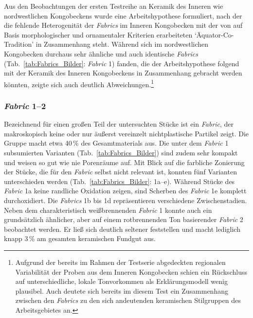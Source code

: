 Aus den Beobachtungen der ersten Testreihe an Keramik des Inneren wie nordwestlichen Kongobeckens wurde eine Arbeitshypothese formuliert, nach der die fehlende Heterogenität der \textit{Fabrics} im Inneren Kongobecken mit der von \textcite[58ff.]{Wotzka.1995} auf Basis morphologischer und ornamentaler Kriterien erarbeiteten \enquote*{Äquator-Co-Tradition} in Zusammenhang steht. Während sich im nordwestlichen Kongobecken durchaus sehr ähnliche und auch identische \textit{Fabrics} (Tab.~\ref{tab:Fabrics_Bilder}: \textit{Fabric} 1) fanden, die der Arbeitshypothese folgend mit der Keramik des Inneren Kongobeckens in Zusammenhang gebracht werden könnten, zeigte sich auch deutlich Abweichungen.\footnote{Aufgrund der bereits im Rahmen der Testserie abgedeckten regionalen Variabilität der Proben aus dem Inneren Kongobecken schien ein Rückschluss auf unterschiedliche, lokale Tonvorkommen als Erklärungsmodell wenig plausibel. Auch deutete sich bereits im diesem Test ein Zusammenhang zwischen den \textit{Fabrics} zu den sich andeutenden keramischen Stilgruppen des Arbeitsgebietes an.}


\subsubsection*{\textit{Fabric} 1--2}

Bezeichnend für einen großen Teil der untersuchten Stücke ist ein \textit{Fabric}, der makroskopisch keine oder nur äußerst vereinzelt nichtplastische Partikel zeigt. Die Gruppe macht etwa 40\,\% des Gesamtmaterials aus. Die unter dem \textit{Fabric} 1 subsumierten Varianten (Tab.~\ref{tab:Fabrics_Bilder}) sind zudem sehr kompakt und weisen so gut wie nie Porenräume auf. Mit Blick auf die farbliche Zonierung der Stücke, die für den \textit{Fabric} selbst nicht relevant ist, konnten fünf Varianten unterschieden werden (Tab.~\ref{tab:Fabrics_Bilder}: 1a--e). Während Stücke des \textit{Fabric} 1a keine randliche Oxidation zeigen, sind Scherben des \textit{Fabric} 1e komplett durchoxidiert. Die \textit{Fabrics} 1b bis 1d repräsentieren verschiedene Zwischenstadien. Neben dem charakteristisch weißbrennenden \textit{Fabric} 1 konnte auch ein grundsätzlich ähnlicher, aber auf einem rotbrennenden Ton basierender \textit{Fabric} 2 beobachtet werden. Er ließ sich deutlich seltener feststellen und macht lediglich knapp 3\,\% am gesamten keramischen Fundgut aus.

